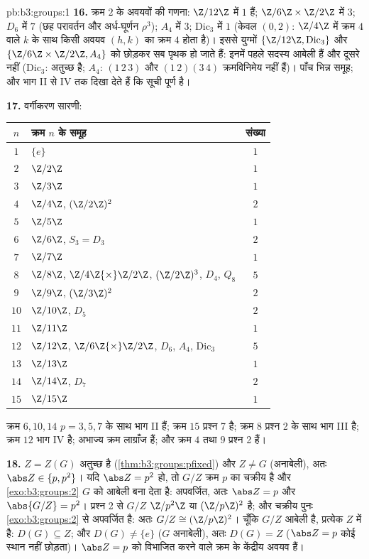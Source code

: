 \begin{solution}{pb:b3:groups:1}
\textbf{16.} क्रम $2$ के अवयवों की गणना: $\Z/12\Z$ में $1$ हैं;
$\Z/6\Z\times\Z/2\Z$ में $3$; $D_6$ में $7$ (छह परावर्तन और अर्ध-घूर्णन $\rho^3$);
$A_4$ में $3$; $\mathrm{Dic}_3$ में $1$ (केवल $(0, 2)$: $\Z/4\Z$ में क्रम $4$
वाले $k$ के साथ किसी अवयव $(h, k)$ का क्रम $4$ होता है)। इससे
युग्मों $\{\Z/12\Z, \mathrm{Dic}_3\}$ और $\{\Z/6\Z\times\Z/2\Z, A_4\}$ को छोड़कर सब पृथक हो जाते हैं: इनमें पहले
सदस्य आबेली हैं और दूसरे नहीं ($\mathrm{Dic}_3$:  अतुच्छ है; $A_4$: $(1\,2\,3)$
और $(1\,2)(3\,4)$ क्रमविनिमेय नहीं हैं)। पाँच भिन्न समूह; और भाग II से IV तक
दिखा देते हैं कि सूची पूर्ण है।

\textbf{17.} वर्गीकरण सारणी:
\begin{center}
\begin{tabular}{c l c}
$n$ & क्रम $n$ के समूह & संख्या\\
\hline
$1$ & $\{e\}$ & $1$\\
$2$ & $\Z/2\Z$ & $1$\\
$3$ & $\Z/3\Z$ & $1$\\
$4$ & $\Z/4\Z$, $(\Z/2\Z)^2$ & $2$\\
$5$ & $\Z/5\Z$ & $1$\\
$6$ & $\Z/6\Z$, $S_3 = D_3$ & $2$\\
$7$ & $\Z/7\Z$ & $1$\\
$8$ & $\Z/8\Z$, $\Z/4\Z{\times}\Z/2\Z$, $(\Z/2\Z)^3$, $D_4$,
      $Q_8$ & $5$\\
$9$ & $\Z/9\Z$, $(\Z/3\Z)^2$ & $2$\\
$10$ & $\Z/10\Z$, $D_5$ & $2$\\
$11$ & $\Z/11\Z$ & $1$\\
$12$ & $\Z/12\Z$, $\Z/6\Z{\times}\Z/2\Z$, $D_6$, $A_4$,
       $\mathrm{Dic}_3$ & $5$\\
$13$ & $\Z/13\Z$ & $1$\\
$14$ & $\Z/14\Z$, $D_7$ & $2$\\
$15$ & $\Z/15\Z$ & $1$\\
\end{tabular}
\end{center}
क्रम $6, 10, 14$ $p = 3, 5, 7$ के साथ भाग II हैं; क्रम $15$ प्रश्न 7 है; क्रम
$8$ प्रश्न 2 के साथ भाग III है; क्रम $12$ भाग IV है; अभाज्य
क्रम लाग्राँज हैं; और क्रम $4$ तथा $9$ प्रश्न 2 हैं।

\textbf{18.} $Z = Z(G)$ अतुच्छ है (\cref{thm:b3:groups:pfixed}) और $Z \neq G$ (अनाबेली), अतः $\abs Z \in \{p, p^2\}$।
यदि $\abs Z = p^2$ हो, तो $G/Z$ क्रम $p$ का चक्रीय है और \cref{exo:b3:groups:2} $G$ को
आबेली बना देता है: अपवर्जित, अतः $\abs Z = p$ और $\abs{G/Z} = p^2$। प्रश्न 2 से $G/Z$
$\Z/p^2\Z$ या $(\Z/p\Z)^2$ है; और चक्रीय पुनः \cref{exo:b3:groups:2} से अपवर्जित है: अतः $G/Z \cong (\Z/p\Z)^2$।
चूँकि $G/Z$ आबेली है, प्रत्येक  $Z$ में है: $D(G) \subseteq Z$;
और $D(G) \neq \{e\}$ ($G$ अनाबेली), अतः $D(G) = Z$ ($\abs Z = p$ कोई स्थान नहीं छोड़ता)।
 $\abs Z = p$ को विभाजित करने वाले क्रम के केंद्रीय अवयव हैं।


\end{solution}
